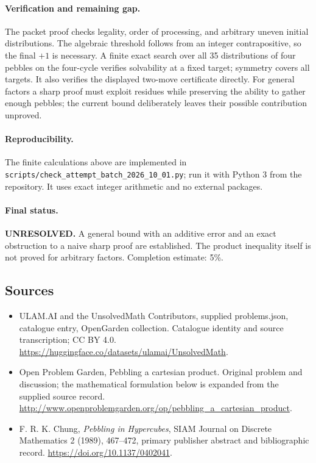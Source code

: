 \documentclass[11pt,a4paper]{article}
\begin{document}
\paragraph{Verification and remaining gap.}
The packet proof checks legality, order of processing, and arbitrary uneven
initial distributions. The algebraic threshold follows from an integer
contrapositive, so the final $+1$ is necessary. A finite exact search over
all 35 distributions of four pebbles on the four-cycle verifies solvability
at a fixed target; symmetry covers all targets. It also verifies the displayed
two-move certificate directly. For general factors a sharp proof must exploit
residues while preserving the ability to gather enough pebbles; the current
bound deliberately leaves their possible contribution unproved.

\paragraph{Reproducibility.}
The finite calculations above are implemented in
\texttt{scripts/check\_attempt\_batch\_2026\_10\_01.py}; run it with Python 3
from the repository. It uses exact integer arithmetic and no external packages.

\paragraph{Final status.}
\textbf{UNRESOLVED.} A general bound with an additive error and an exact
obstruction to a naive sharp proof are established. The product inequality
itself is not proved for arbitrary factors. Completion estimate: 5\%.

\subsection{Sources}
\begin{itemize}
\item[S1] ULAM.AI and the UnsolvedMath Contributors, supplied problems.json, catalogue entry, OpenGarden collection. Catalogue identity and source transcription; CC BY 4.0.
\url{https://huggingface.co/datasets/ulamai/UnsolvedMath}.
\item[S2] Open Problem Garden, Pebbling a cartesian product. Original problem and discussion; the mathematical formulation below is expanded from the supplied source record.
\url{http://www.openproblemgarden.org/op/pebbling_a_cartesian_product}.
\item[A1] F. R. K. Chung, \emph{Pebbling in Hypercubes}, SIAM Journal on Discrete Mathematics 2 (1989), 467--472, primary publisher abstract and bibliographic record. \url{https://doi.org/10.1137/0402041}.
\end{itemize}
\end{document}
